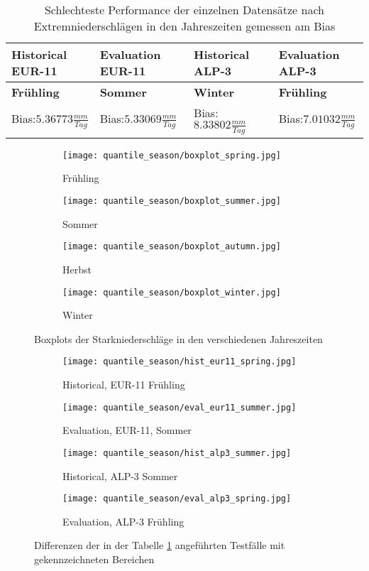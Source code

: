 \begin{table}[h]
	\begin{tabularx}{\textwidth}{|X|X|X|X|}
		\hline
		\textbf{Historical EUR-11} & \textbf{Evaluation EUR-11}& \textbf{Historical ALP-3} & \textbf{Evaluation ALP-3}\\
		\hline
		\textbf{Frühling}  & \textbf{Sommer}  & \textbf{Winter} & \textbf{Frühling} \\
		Bias:$5.36773\frac{mm}{Tag}$& Bias:$5.33069\frac{mm}{Tag}$ & Bias:$8.33802\frac{mm}{Tag}$ & Bias:$7.01032\frac{mm}{Tag}$\\
		\hline
	\end{tabularx}
	\caption{Schlechteste Performance der einzelnen Datensätze nach Extremniederschlägen in den Jahreszeiten gemessen am Bias}
	\label{tab:season_dataset}
\end{table}
\begin{figure}
	\begin{subfigure}{0.49\textwidth}
		\texttt{[image: quantile\_season/boxplot\_spring.jpg]}
		\caption{Frühling}
	\end{subfigure}
	\begin{subfigure}{0.49\textwidth}
		\texttt{[image: quantile\_season/boxplot\_summer.jpg]}
		\caption{Sommer}
	\end{subfigure}
	\begin{subfigure}{0.49\textwidth}
		\texttt{[image: quantile\_season/boxplot\_autumn.jpg]}
		\caption{Herbst}
	\end{subfigure}
	\begin{subfigure}{0.49\textwidth}
		\texttt{[image: quantile\_season/boxplot\_winter.jpg]}
		\caption{Winter}
	\end{subfigure}
	\caption{Boxplots der Starkniederschläge in den verschiedenen Jahreszeiten}
	\label{fig:seasons_boxplots}
\end{figure}
\begin{figure}
	\begin{subfigure}{0.49\textwidth}
		\texttt{[image: quantile\_season/hist\_eur11\_spring.jpg]}
		\caption{Historical, EUR-11 Frühling}
		\label{fig:seasons_dif:hist_eur11}
	\end{subfigure}
	\begin{subfigure}{0.49\textwidth}
		\texttt{[image: quantile\_season/eval\_eur11\_summer.jpg]}
		\caption{Evaluation, EUR-11, Sommer}
		\label{fig:seasons_dif:eval_eur_11}
	\end{subfigure}
	\begin{subfigure}{0.49\textwidth}
		\texttt{[image: quantile\_season/hist\_alp3\_summer.jpg]}
		\caption{Historical, ALP-3 Sommer}
		\label{fig:seasons_dif:hist_alp3}
	\end{subfigure}
	\begin{subfigure}{0.49\textwidth}
		\texttt{[image: quantile\_season/eval\_alp3\_spring.jpg]}
		\caption{Evaluation, ALP-3 Frühling}
	\end{subfigure}
	\caption{Differenzen der in der Tabelle \ref{tab:season_dataset} angeführten Testfälle mit gekennzeichneten Bereichen}
	\label{fig:seasons_dif}
\end{figure}
